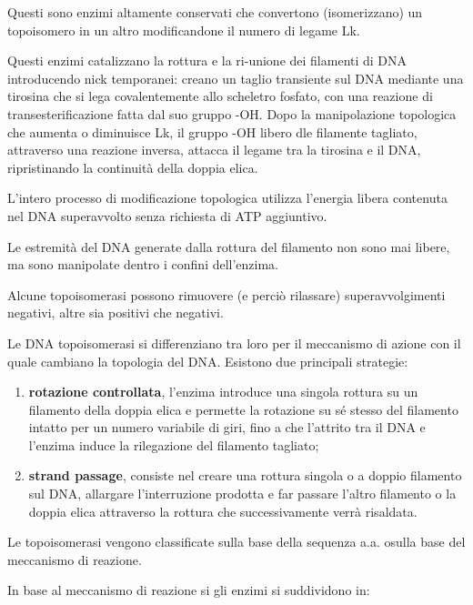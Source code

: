 \documentclass[]{article}
\begin{document}
Questi sono enzimi altamente conservati che convertono (isomerizzano) un
topoisomero in un altro modificandone il numero di legame Lk.

Questi enzimi catalizzano la rottura e la ri-unione dei filamenti di DNA
introducendo nick temporanei: creano un taglio transiente sul DNA
mediante una tirosina che si lega covalentemente allo scheletro fosfato,
con una reazione di transesterificazione fatta dal suo gruppo -OH. Dopo
la manipolazione topologica che aumenta o diminuisce Lk, il gruppo -OH
libero dle filamente tagliato, attraverso una reazione inversa, attacca
il legame tra la tirosina e il DNA, ripristinando la continuità della
doppia elica.

L'intero processo di modificazione topologica utilizza l'energia libera
contenuta nel DNA superavvolto senza richiesta di ATP aggiuntivo.

Le estremità del DNA generate dalla rottura del filamento non sono mai
libere, ma sono manipolate dentro i confini dell'enzima.

Alcune topoisomerasi possono rimuovere (e perciò rilassare)
superavvolgimenti negativi, altre sia positivi che negativi.

Le DNA topoisomerasi si differenziano tra loro per il meccanismo di
azione con il quale cambiano la topologia del DNA. Esistono due
principali strategie:

\begin{enumerate}
\def\labelenumi{\arabic{enumi}.}
\itemsep1pt\parskip0pt
\item
  \textbf{rotazione controllata}, l'enzima introduce una singola rottura
  su un filamento della doppia elica e permette la rotazione su sé
  stesso del filamento intatto per un numero variabile di giri, fino a
  che l'attrito tra il DNA e l'enzima induce la rilegazione del
  filamento tagliato;
\item
  \textbf{strand passage}, consiste nel creare una rottura singola o a
  doppio filamento sul DNA, allargare l'interruzione prodotta e far
  passare l'altro filamento o la doppia elica attraverso la rottura che
  successivamente verrà risaldata.
\end{enumerate}

Le topoisomerasi vengono classificate sulla base della sequenza a.a.
osulla base del meccanismo di reazione.

In base al meccanismo di reazione si gli enzimi si suddividono in:
\end{document}
